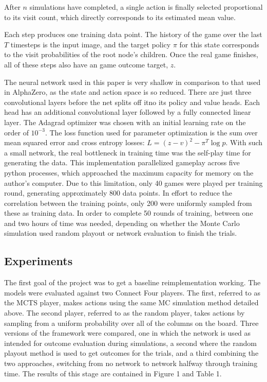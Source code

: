 \documentclass[twoside,11pt]{article}
\begin{document}
After $n$ simulations have completed, a single action is finally selected proportional to its visit
count, which directly corresponds to its estimated mean value.

Each step produces one training data point. The history of the game over the last $T$ timesteps
is the input image, and the target policy $\pi$ for this state corresponds to the 
visit probabilities of the root node's children. Once the real game finishes, all of these steps
also have an game outcome target, $z$. 
 
The neural network used in this paper is very shallow in comparison to that used in AlphaZero, 
as the state and action space is so reduced. There are just three convolutional layers before
the net splits off itno its policy and value heads. Each head has an additional convolutional 
layer followed by a fully connected linear layer. The Adagrad optimizer was chosen with an
initial learning rate on the order of $10^{-3}$. 
The loss function used for parameter optimization is the sum 
over mean squared error and cross entropy losses: $L = (z-v)^2 - \pi^T \log p$.
With such a small network, the real bottleneck in training time was the self-play 
time for generating the data. This implementation parallelized gameplay across five python
processes, which approached the maximum capacity for memory on the author's computer. Due to
this limitation, only 40 games were played per training round, generating approximately 800 data points. 
In effort to reduce the correlation between the training points, only 200 were uniformly sampled
from these as training data. In order to complete 50 rounds of training, between one and two
hours of time was needed, depending on whether the Monte Carlo simulation used random
playout or network evaluation to finish the trials.


\subsection{Experiments}
The first goal of the project was to get a baseline reimplementation working. 
The models were evaluated against two Connect Four players. The first, referred to
as the MCTS player, makes actions using the same MC simulation method detailed above.
The second player, referred to as the random player, takes actions by sampling 
from a uniform probability over all of the columns on the board. 
Three versions of the framework were compared, one in which the network is used
as intended for outcome evaluation during simulations, a second where the random 
playout method is used to get outcomes for the trials, and a third combining 
the two approaches, switching from no network to network halfway through training time.
The results of this stage are contained in Figure 1 and Table 1.
\end{document}
